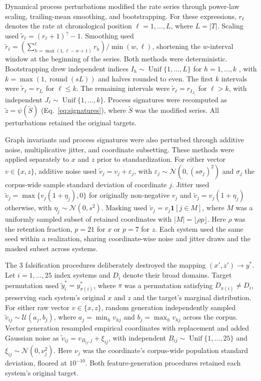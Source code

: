 \documentclass{article}
\begin{document}
Dynamical process perturbations modified the rate series through power-law scaling, trailing-mean smoothing, and bootstrapping. For these expressions, $r_{\ell}$ denotes the rate at chronological position $\ell = 1, \ldots, L$, where $L = \lvert T \rvert$. Scaling used $\widetilde{r}_{\ell} = (r_{\ell} + 1)^{\gamma} - 1$. Smoothing used $\widetilde{r}_{\ell} = (\sum_{h=\max(1,\ell-w+1)}^{\ell} r_h)/\min(w,\ell)$, shortening the $w$-interval window at the beginning of the series. Both methods were deterministic. Bootstrapping drew independent indices $I_h \sim \operatorname{Unif}\{1, \ldots, L\}$ for $h = 1, \ldots, k$ \citep{ref75}, with $k = \max(1, \operatorname{round}(sL))$ and halves rounded to even. The first $k$ intervals were $\widetilde{r}_{\ell} = r_{I_{\ell}}$ for $\ell \le k$. The remaining intervals were $\widetilde{r}_{\ell} = r_{I_{J_{\ell}}}$ for $\ell > k$, with independent $J_{\ell} \sim \operatorname{Unif}\{1, \ldots, k\}$. Process signatures were recomputed as $\widetilde{z} = \psi(\widetilde{S})$ (Eq.~\eqref{eq:signatures}), where $\widetilde{S}$ was the modified series. All perturbations retained the original targets.

Graph invariants and process signatures were also perturbed through additive noise, multiplicative jitter, and coordinate subsetting. These methods were applied separately to $x$ and $z$ prior to standardization. For either vector $v \in \{x, z\}$, additive noise used $\widetilde{v}_j = v_j + \varepsilon_j$, with $\varepsilon_j \sim \mathcal{N}(0, (s\sigma_j)^2)$ and $\sigma_j$ the corpus-wide sample standard deviation of coordinate $j$. Jitter used $\widetilde{v}_j = \max\{v_j(1 + \eta_j), 0\}$ for originally non-negative $v_j$ and $\widetilde{v}_j = v_j(1 + \eta_j)$ otherwise, with $\eta_j \sim \mathcal{N}(0, s^2)$. Masking used $\widetilde{v}_j = v_j\mathbf{1}[j \in M]$, where $M$ was a uniformly sampled subset of retained coordinates with $\lvert M \rvert = \lfloor \rho p \rfloor$. Here $\rho$ was the retention fraction, $p = 21$ for $x$ or $p = 7$ for $z$. Each system used the same seed within a realization, sharing coordinate-wise noise and jitter draws and the masked subset across systems.

The 3 falsification procedures deliberately destroyed the mapping $(x', z') \to y^*$. Let $i = 1, \ldots, 25$ index systems and $D_i$ denote their broad domains. Target permutation used $\widetilde{y}_i^{*} = y_{\pi(i)}^{*}$, where $\pi$ was a permutation satisfying $D_{\pi(i)} \ne D_i$, preserving each system's original $x$ and $z$ and the target's marginal distribution. For either raw vector $v \in \{x, z\}$, random generation independently sampled $\widetilde{v}_{ij} \sim \mathcal{U}(a_j, b_j)$, where $a_j = \min_h v_{hj}$ and $b_j = \max_h v_{hj}$ across the corpus. Vector generation resampled empirical coordinates with replacement \citep{ref75} and added Gaussian noise as $\widetilde{v}_{ij} = v_{B_{ij},j} + \xi_{ij}$, with independent $B_{ij} \sim \operatorname{Unif}\{1, \ldots, 25\}$ and $\xi_{ij} \sim \mathcal{N}(0, \nu_j^2)$. Here $\nu_j$ was the coordinate's corpus-wide population standard deviation, floored at $10^{-10}$. Both feature-generation procedures retained each system's original target.
\end{document}
